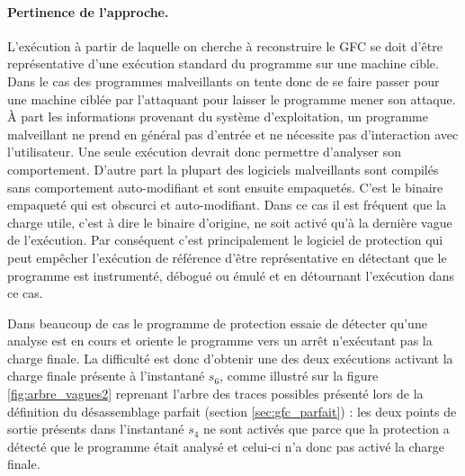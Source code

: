 \paragraph{Pertinence de l'approche.}
L'exécution à partir de laquelle on cherche à reconstruire le GFC se doit d'être représentative d'une exécution standard du programme sur une machine cible.
Dans le cas des programmes malveillants on tente donc de se faire passer pour une machine ciblée par l'attaquant pour laisser le programme mener son attaque. 
À part les informations provenant du système d'exploitation, un programme malveillant ne prend en général pas d'entrée et ne nécessite pas d'interaction avec l'utilisateur. Une seule exécution devrait donc permettre d'analyser son comportement.
D'autre part la plupart des logiciels malveillants sont compilés sans comportement auto-modifiant et sont ensuite empaquetés. C'est le binaire empaqueté qui est obscurci et auto-modifiant.
Dans ce cas il est fréquent \cite{Calvet2013} que la charge utile, c'est à dire le binaire d'origine, ne soit activé qu'à la dernière vague de l'exécution.
Par conséquent c'est principalement le logiciel de protection qui peut empêcher l'exécution de référence d'être représentative en détectant que le programme est instrumenté, débogué ou émulé et en détournant l'exécution dans ce cas.

Dans beaucoup de cas le programme de protection essaie de détecter qu'une analyse est en cours et oriente le programme vers un arrêt n'exécutant pas la charge finale.
La difficulté est donc d'obtenir une des deux exécutions activant la charge finale présente à l'instantané $s_6$, comme illustré sur la figure \ref{fig:arbre_vagues2} reprenant l'arbre des traces possibles présenté lors de la définition du désassemblage parfait (section \ref{sec:gfc_parfait}) : les deux points de sortie présents dans l'instantané $s_4$ ne sont activés que parce que la protection a détecté que le programme était analysé et celui-ci n'a donc pas activé la charge finale.

